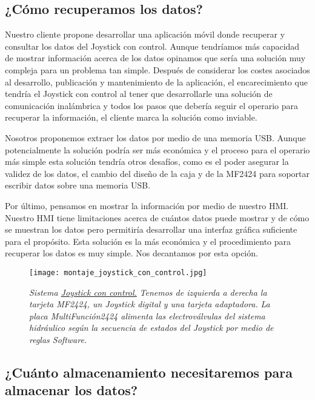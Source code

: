 \subsection{¿Cómo recuperamos los datos?}

Nuestro cliente propone desarrollar una aplicación móvil donde recuperar y consultar los datos
del Joystick con control. Aunque tendríamos más capacidad de mostrar información acerca de los
datos opinamos que sería una solución muy compleja para un problema tan simple.
Después de considerar los costes asociados al desarrollo, publicación
y mantenimiento de la aplicación, el encarecimiento que tendría el Joystick con control
al tener que desarrollarle una solución de comunicación inalámbrica y todos los pasos que
debería seguir el operario para recuperar la información, el cliente marca la solución como inviable.

Nosotros proponemos extraer los datos por medio de una memoria USB. Aunque potencialmente la solución
podría ser más económica y el proceso para el operario más simple esta solución tendría otros
desafíos, como es el poder asegurar la validez de los datos, el cambio del diseño de la caja y de
la MF2424 para soportar escribir datos sobre una memoria USB.

Por último, pensamos en mostrar la información por medio de nuestro HMI. Nuestro HMI tiene limitaciones
acerca de cuántos datos puede mostrar y de cómo se muestran los datos pero permitiría desarrollar una
interfaz gráfica suficiente para el propósito. Esta solución es la más económica
y el procedimiento para recuperar los datos es muy simple. Nos decantamos por esta opción.

\begin{figure}[!b]
    \centering
    \texttt{[image: montaje\_joystick\_con\_control.jpg]}
    \caption{\textit{Sistema \hyperref[sec:joystick_con_control]{Joystick con control.}} \textit{Tenemos de
    izquierda a derecha la tarjeta MF2424, un Joystick digital y una tarjeta adaptadora.}
    \textit{La placa MultiFunción2424 alimenta las electroválvulas del
    sistema hidráulico según la secuencia de estados del Joystick por medio de reglas Software.}}
\end{figure}

\subsection{¿Cuánto almacenamiento necesitaremos para almacenar los datos?}

